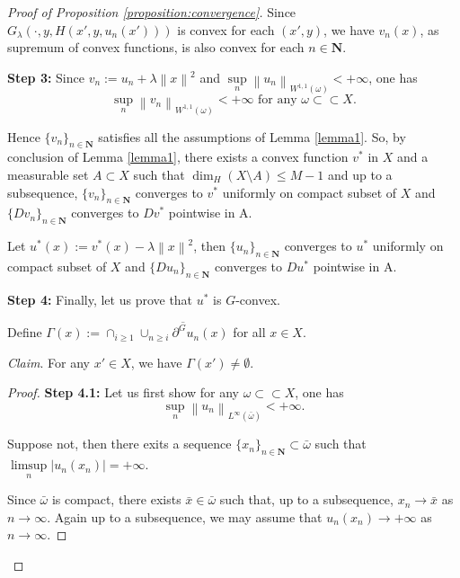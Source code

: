 \documentclass[a4paper, 11pt]{amsart}
\numberwithin{equation}{section}
\theoremstyle{plain}
\theoremstyle{definition}
\theoremstyle{remark}
\newcommand{\N}{\mathbf{N}}
\newcommand{\norm}[1]{\left\lVert#1\right\rVert}
\begin{document}
\begin{proof}[Proof of Proposition \ref{proposition:convergence}]
	
	Since $G_{\lambda}(\cdot,y,H(x',y,u_n(x')))$ is convex for each $(x', y)$, we have $v_n(x)$, as supremum of convex functions, is also convex for each $n \in \N$.\medskip
	
	
	
{\bf Step 3:}	Since $v_n:= u_n +\lambda\norm{x}^2$ and $\sup\limits_{n}\norm{u_n}_{W^{1,1}(\omega)} < +\infty$, one has 
	$$\sup\limits_{n}\norm{v_n}_{W^{1,1}(\omega)} < +\infty \text{ for any $\omega \subset \subset X$.} $$

Hence $\{v_n\}_{n\in \N}$ satisfies all the assumptions of Lemma \ref{lemma1}. So, by conclusion of Lemma \ref{lemma1}, there exists a convex function $v^*$ in $X$ and a measurable set $A \subset X$ such that $\dim_{H} (X \setminus A)\le M-1$ and up to a subsequence, $\{v_n\}_{n\in \N}$ converges to $v^*$ uniformly on compact subset of $X$ and $\{D v_n\}_{n\in \N}$ converges to $D v^*$ pointwise in A.
	
	Let $u^*(x):=v^*(x)-\lambda\norm{x}^2$, then  $\{u_n\}_{n\in \N}$ converges to $u^*$ uniformly on compact subset of $X$ and $\{D u_n\}_{n\in \N}$ converges to $D u^*$ pointwise in A.\medskip
	
{\bf Step 4:}	Finally, let us prove that $u^*$ is $G$-convex.\medskip

	Define $\Gamma(x):=\cap_{i\ge 1}\overline{\cup_{n\ge i}\partial^G u_n(x)}$ for all $x\in X$.\medskip
	
	
\noindent
{\it Claim}. For any $x'\in X$, we have $\Gamma(x') \neq \emptyset$.\medskip
	
\begin{proof}
	{\bf Step 4.1:} Let us first show for any $\omega \subset\subset X$, one has $$\sup\limits_{n}\norm{u_n}_{L^{\infty}(\bar{\omega})}<+\infty.$$
	
	Suppose not, then there exits a sequence $\{x_n\}_{n\in \N}\subset \bar{\omega}$ such that $\limsup\limits_{n}|u_n(x_n)|=+\infty$.
	
	Since $\bar{\omega}$ is compact, there exists $\bar{x}\in \bar{\omega}$ such that, up to a subsequence, $x_n\rightarrow \bar{x}$ as $n \rightarrow \infty$. Again up to a subsequence, we may assume that $u_n(x_n)\rightarrow +\infty$ as $n \rightarrow \infty$.
	

\end{proof}
\end{proof}
\end{document}
